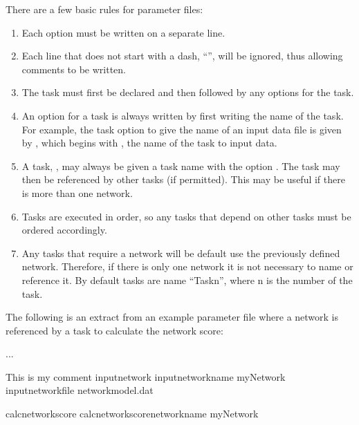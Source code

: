 \documentclass[letterpaper,10pt,english]{sphinxmanual}
\begin{document}
\sphinxAtStartPar
There are a few basic rules for parameter files:
\begin{enumerate}
%
\item {} 
\sphinxAtStartPar
Each option must be written on a separate line.

\item {} 
\sphinxAtStartPar
Each line that does not start with a dash, “\sphinxhyphen{}”, will be ignored, thus allowing comments to be written.

\item {} 
\sphinxAtStartPar
The task must first be declared and then followed by any options for the task.

\item {} 
\sphinxAtStartPar
An option for a task is always written by first writing the name of the task. For example, the task option to give the name of an input data file is given by , which begins with , the name of the task to input data.

\item {} 
\sphinxAtStartPar
A task, , may always be given a task name with the option . The task may then be referenced by other tasks (if permitted). This may be useful if there is more than one network.

\item {} 
\sphinxAtStartPar
Tasks are executed in order, so any tasks that depend on other tasks must be ordered accordingly.

\item {} 
\sphinxAtStartPar
Any tasks that require a network will be default use the previously defined network. Therefore, if there is only one network it is not necessary to name or reference it. By default tasks are name “Task\sphinxhyphen{}n”, where n is the number of the task.

\end{enumerate}

\sphinxAtStartPar
The following is an extract from an example parameter file where a network is referenced by a task to calculate the network score:

\begin{sphinxVerbatim}[commandchars=\\\{\}]
...

\PYGZsh{} This is my comment
\PYGZhy{}input\PYGZhy{}network
\PYGZhy{}input\PYGZhy{}network\PYGZhy{}name myNetwork
\PYGZhy{}input\PYGZhy{}network\PYGZhy{}file network\PYGZhy{}model.dat

\PYGZhy{}calc\PYGZhy{}network\PYGZhy{}score
\PYGZhy{}calc\PYGZhy{}network\PYGZhy{}score\PYGZhy{}network\PYGZhy{}name myNetwork
\end{sphinxVerbatim}
\end{document}
